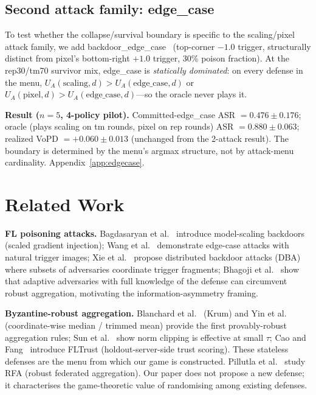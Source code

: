\documentclass{article}
\newcommand{\UA}{U_A}
\begin{document}
\subsection{Second attack family: edge\_case}
\label{sec:edgecase}

To test whether the collapse/survival boundary is specific to the scaling/pixel attack family, we add backdoor\_edge\_case~\citep{wang2020attack} (top-corner $-1.0$ trigger, structurally distinct from pixel's bottom-right $+1.0$ trigger, $30\%$ poison fraction). At the rep30/tm70 survivor mix, edge\_case is \emph{statically dominated}: on every defense in the menu, $\UA(\text{scaling}, d) > \UA(\text{edge\_case}, d)$ or $\UA(\text{pixel}, d) > \UA(\text{edge\_case}, d)$---so the oracle never plays it.

\textbf{Result ($n=5$, 4-policy pilot).} Committed-edge\_case ASR $= 0.476 \pm 0.176$; oracle (plays scaling on tm rounds, pixel on rep rounds) ASR $= 0.880 \pm 0.063$; realized VoPD $= +0.060 \pm 0.013$ (unchanged from the 2-attack result). The boundary is determined by the menu's argmax structure, not by attack-menu cardinality. Appendix~\ref{app:edgecase}.

\section{Related Work}
\label{sec:related}

\textbf{FL poisoning attacks.} Bagdasaryan et al.~\citep{bagdasaryan2020backdoor} introduce model-scaling backdoors (scaled gradient injection); Wang et al.~\citep{wang2020attack} demonstrate edge-case attacks with natural trigger images; Xie et al.~\citep{xie2019dba} propose distributed backdoor attacks (DBA) where subsets of adversaries coordinate trigger fragments; Bhagoji et al.~\citep{bhagoji2019analyzing} show that adaptive adversaries with full knowledge of the defense can circumvent robust aggregation, motivating the information-asymmetry framing.

\textbf{Byzantine-robust aggregation.} Blanchard et al.~\citep{blanchard2017machine} (Krum) and Yin et al.~\citep{yin2018byzantine} (coordinate-wise median / trimmed mean) provide the first provably-robust aggregation rules; Sun et al.~\citep{sun2019can} show norm clipping is effective at small $\tau$; Cao and Fang~\citep{cao2021fltrust} introduce FLTrust (holdout-server-side trust scoring). These stateless defenses are the menu from which our game is constructed. Pillutla et al.~\citep{pillutla2019robust} study RFA (robust federated aggregation). Our paper does not propose a new defense; it characterises the game-theoretic value of randomising among existing defenses.
\end{document}
